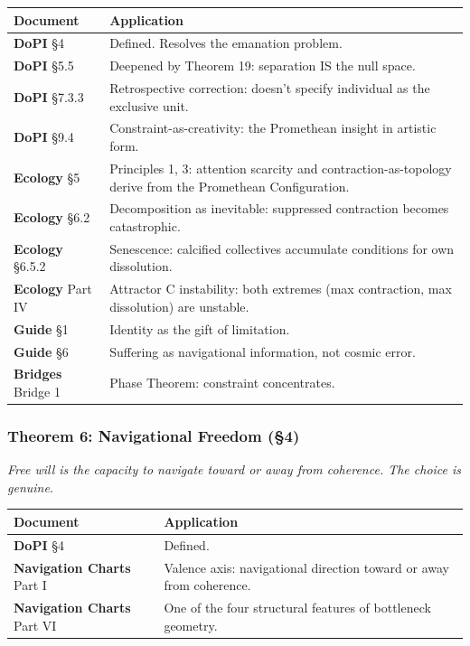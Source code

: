 \begin{longtable}{>{\raggedright\arraybackslash}p{} >{\raggedright\arraybackslash}p{}}
\toprule
\textbf{Document} & \textbf{Application} \\
\midrule
\endhead
\textbf{DoPI} §4 & Defined. Resolves the emanation problem. \\
\textbf{DoPI} §5.5 & Deepened by Theorem 19: separation IS the null space. \\
\textbf{DoPI} §7.3.3 & Retrospective correction: doesn't specify individual as the exclusive unit. \\
\textbf{DoPI} §9.4 & Constraint-as-creativity: the Promethean insight in artistic form. \\
\textbf{Ecology} §5 & Principles 1, 3: attention scarcity and contraction-as-topology derive from the Promethean Configuration. \\
\textbf{Ecology} §6.2 & Decomposition as inevitable: suppressed contraction becomes catastrophic. \\
\textbf{Ecology} §6.5.2 & Senescence: calcified collectives accumulate conditions for own dissolution. \\
\textbf{Ecology} Part IV & Attractor C instability: both extremes (max contraction, max dissolution) are unstable. \\
\textbf{Guide} §1 & Identity as the gift of limitation. \\
\textbf{Guide} §6 & Suffering as navigational information, not cosmic error. \\
\textbf{Bridges} Bridge 1 & Phase Theorem: constraint concentrates. \\
\bottomrule
\end{longtable}



\subsubsection*{Theorem 6: Navigational Freedom (§4)}


\textit{Free will is the capacity to navigate toward or away from coherence. The choice is genuine.}



\begin{longtable}{>{\raggedright\arraybackslash}p{} >{\raggedright\arraybackslash}p{}}
\toprule
\textbf{Document} & \textbf{Application} \\
\midrule
\endhead
\textbf{DoPI} §4 & Defined. \\
\textbf{Navigation Charts} Part I & Valence axis: navigational direction toward or away from coherence. \\
\textbf{Navigation Charts} Part VI & One of the four structural features of bottleneck geometry. \\
\bottomrule
\end{longtable}



